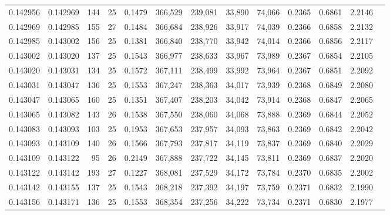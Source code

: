 \begin{tabular}{rrrrrrrrrrrrr}
0.142956 & 0.142969 &   144 &  25 &                                     0.1479 & 366,529 & 239,081 &  33,890 &  74,066 & 0.2365 & 0.6861 & 2.2146 \\
0.142969 & 0.142985 &   155 &  27 &                                     0.1484 & 366,684 & 238,926 &  33,917 &  74,039 & 0.2366 & 0.6858 & 2.2132 \\
0.142985 & 0.143002 &   156 &  25 &                                     0.1381 & 366,840 & 238,770 &  33,942 &  74,014 & 0.2366 & 0.6856 & 2.2117 \\
0.143002 & 0.143020 &   137 &  25 &                                     0.1543 & 366,977 & 238,633 &  33,967 &  73,989 & 0.2367 & 0.6854 & 2.2105 \\
0.143020 & 0.143031 &   134 &  25 &                                     0.1572 & 367,111 & 238,499 &  33,992 &  73,964 & 0.2367 & 0.6851 & 2.2092 \\
0.143031 & 0.143047 &   136 &  25 &                                     0.1553 & 367,247 & 238,363 &  34,017 &  73,939 & 0.2368 & 0.6849 & 2.2080 \\
0.143047 & 0.143065 &   160 &  25 &                                     0.1351 & 367,407 & 238,203 &  34,042 &  73,914 & 0.2368 & 0.6847 & 2.2065 \\
0.143065 & 0.143082 &   143 &  26 &                                     0.1538 & 367,550 & 238,060 &  34,068 &  73,888 & 0.2369 & 0.6844 & 2.2052 \\
0.143083 & 0.143093 &   103 &  25 &                                     0.1953 & 367,653 & 237,957 &  34,093 &  73,863 & 0.2369 & 0.6842 & 2.2042 \\
0.143093 & 0.143109 &   140 &  26 &                                     0.1566 & 367,793 & 237,817 &  34,119 &  73,837 & 0.2369 & 0.6840 & 2.2029 \\
0.143109 & 0.143122 &    95 &  26 &                                     0.2149 & 367,888 & 237,722 &  34,145 &  73,811 & 0.2369 & 0.6837 & 2.2020 \\
0.143122 & 0.143142 &   193 &  27 &                                     0.1227 & 368,081 & 237,529 &  34,172 &  73,784 & 0.2370 & 0.6835 & 2.2002 \\
0.143142 & 0.143155 &   137 &  25 &                                     0.1543 & 368,218 & 237,392 &  34,197 &  73,759 & 0.2371 & 0.6832 & 2.1990 \\
0.143156 & 0.143171 &   136 &  25 &                                     0.1553 & 368,354 & 237,256 &  34,222 &  73,734 & 0.2371 & 0.6830 & 2.1977 \\

\end{tabular}
